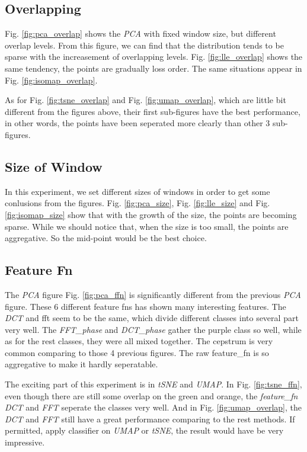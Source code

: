\documentclass[conference]{IEEEtran}
\begin{document}
\subsection{Overlapping}
Fig. \ref{fig:pca_overlap} shows the \textit{PCA} with fixed window size, 
but different overlap levels. 
From this figure, 
we can find that the distribution 
tends to be sparse with the increasement of overlapping levels. 
Fig. \ref{fig:lle_overlap} shows the same tendency, the points are gradually loss order.
The same situations appear in Fig. \ref{fig:isomap_overlap}.

As for Fig. \ref{fig:tsne_overlap} and Fig. \ref{fig:umap_overlap}, 
which are little bit different from the figures above, their first sub-figures have the best performance,
in other words, the points have been seperated more clearly than other 3 sub-figures.
\subsection{Size of Window}
In this experiment, we set different sizes of windows in order to get some conlusions from the figures.
Fig. \ref{fig:pca_size}, Fig. \ref{fig:lle_size} and Fig. \ref{fig:isomap_size} show that with the growth of the size, the points are becoming sparse.
While we should notice that, when the size is too small, the points are aggregative. 
So the mid-point would be the best choice.
\subsection{Feature Fn}
The \textit{PCA} figure Fig. \ref{fig:pca_ffn} is significantly different from 
the previous \textit{PCA} figure.
These 6 different feature fns has shown many interesting features. 
The \textit{DCT} and fft seem to be the same, which divide different classes into several part very well.
The \textit{FFT\_phase} and \textit{DCT\_phase} gather the purple class so well, 
while as for the rest classes,
they were all mixed together.
The cepstrum is very common comparing to those 4 previous figures. 
The raw feature\_fn is so aggregative to make it hardly seperatable.

The exciting part of this experiment is in \textit{tSNE} and \textit{UMAP}. 
In Fig. \ref{fig:tsne_ffn}, even though there are still some overlap on the green and orange,
the \textit{feature\_fn} \textit{DCT} and \textit{FFT} seperate the classes very well. 
And in Fig. \ref{fig:umap_overlap}, the \textit{DCT} and \textit{FFT} still have a great performance comparing to the rest methods.
If permitted, apply classifier on \textit{UMAP} or \textit{tSNE}, 
the result would have be very impressive.
\end{document}
